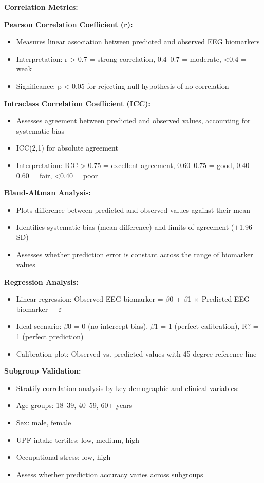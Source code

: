 \documentclass[journal,twoside,10pt]{IEEEtran}
\begin{document}
\textbf{Correlation Metrics:}

\textbf{Pearson Correlation Coefficient (r):}
\begin{itemize}
\item Measures linear association between predicted and observed EEG biomarkers
\item Interpretation: r > 0.7 = strong correlation, 0.4--0.7 = moderate, <0.4 = weak
\item Significance: p < 0.05 for rejecting null hypothesis of no correlation
\end{itemize}

\textbf{Intraclass Correlation Coefficient (ICC):}
\begin{itemize}
\item Assesses agreement between predicted and observed values, accounting for systematic bias
\item ICC(2,1) for absolute agreement
\item Interpretation: ICC > 0.75 = excellent agreement, 0.60--0.75 = good, 0.40--0.60 = fair, <0.40 = poor
\end{itemize}

\textbf{Bland-Altman Analysis:}
\begin{itemize}
\item Plots difference between predicted and observed values against their mean
\item Identifies systematic bias (mean difference) and limits of agreement ($\pm$1.96 SD)
\item Assesses whether prediction error is constant across the range of biomarker values
\end{itemize}

\textbf{Regression Analysis:}
\begin{itemize}
\item Linear regression: Observed EEG biomarker = $\beta$0 + $\beta$1 $\times$ Predicted EEG biomarker + $\varepsilon$
\item Ideal scenario: $\beta$0 = 0 (no intercept bias), $\beta$1 = 1 (perfect calibration), R? = 1 (perfect prediction)
\item Calibration plot: Observed vs. predicted values with 45-degree reference line
\end{itemize}

\textbf{Subgroup Validation:}
\begin{itemize}
\item Stratify correlation analysis by key demographic and clinical variables:
\item Age groups: 18--39, 40--59, 60+ years
\item Sex: male, female
\item UPF intake tertiles: low, medium, high
\item Occupational stress: low, high
\item Assess whether prediction accuracy varies across subgroups
\end{itemize}
\end{document}
